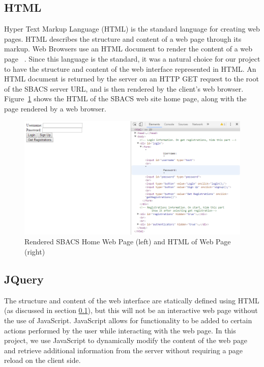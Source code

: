 \documentclass[12pt]{report}
\let\Oldsubsection\subsection
\renewcommand{\subsection}{\FloatBarrier\Oldsubsection}
\begin{document}
\subsection{HTML} \label{html}

Hyper Text Markup Language (HTML) is the standard language for creating web pages. HTML describes the
structure and content of a web page through its markup. Web Browsers use an HTML document to render
the content of a web page ~\autocite{HTMLREF}. Since this language is the standard, it was a natural choice for our
project to have the structure and content of the web interface represented in HTML. An HTML document
is returned by the server on an HTTP GET request to the root of the SBACS server URL, and is then
rendered by the client's web browser. Figure~\ref{fig:home-html} shows the HTML of the SBACS web site
home page, along with the page rendered by a web browser.

\begin{figure}
    \includegraphics[width=\textwidth]{Diagrams/Server_Diagrams/HTML}
    \caption{Rendered SBACS Home Web Page (left) and HTML of Web Page (right)}
    \label{fig:home-html}
\end{figure}

\subsection{JQuery} \label{jquery}

The structure and content of the web interface are statically defined using HTML (as discussed in section \ref{html}), but this will not
be an interactive web page without the use of JavaScript. JavaScript allows for functionality to be
added to certain actions performed by the user while interacting with the web page. In this project,
we use JavaScript to dynamically modify the content of the web page and retrieve additional
information from the server without requiring a page reload on the client side.
\end{document}
